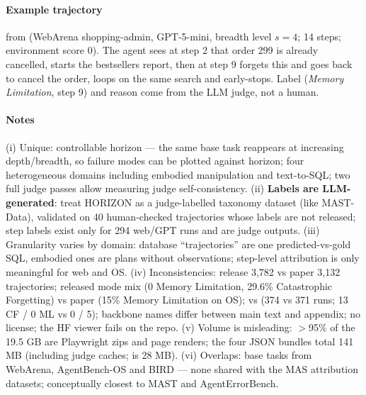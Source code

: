 \paragraph{Example trajectory}  from  (WebArena shopping-admin, GPT-5-mini, breadth level $s{=}4$; 14 steps; environment score 0). The agent sees at step 2 that order 299 is already cancelled, starts the bestsellers report, then at step 9 forgets this and goes back to cancel the order, loops on the same search and early-stops. Label (\emph{Memory Limitation}, step 9) and reason come from the LLM judge, not a human.


\paragraph{Notes} (i) Unique: controllable horizon --- the same base task reappears at increasing depth/breadth, so failure modes can be plotted against horizon; four heterogeneous domains including embodied manipulation and text-to-SQL; two full judge passes allow measuring judge self-consistency. (ii) \textbf{Labels are LLM-generated}: treat HORIZON as a judge-labelled taxonomy dataset (like MAST-Data), validated on 40 human-checked trajectories whose labels are not released; step labels exist only for 294 web/GPT runs and are judge outputs. (iii) Granularity varies by domain: database ``trajectories'' are one predicted-vs-gold SQL, embodied ones are plans without observations; step-level attribution is only meaningful for web and OS. (iv) Inconsistencies: release 3,782 vs paper 3,132 trajectories; released  mode mix (0 Memory Limitation, 29.6\% Catastrophic Forgetting) vs paper (15\% Memory Limitation on OS);  vs  (374 vs 371 runs; 13 CF / 0 ML vs 0 / 5); backbone names differ between main text and appendix; no license; the HF viewer fails on the repo. (v) Volume is misleading: $>$95\% of the 19.5 GB are Playwright zips and page renders; the four  JSON bundles total 141 MB (including judge caches;  is 28 MB). (vi) Overlaps: base tasks from WebArena, AgentBench-OS and BIRD --- none shared with the MAS attribution datasets; conceptually closest to MAST and AgentErrorBench.
